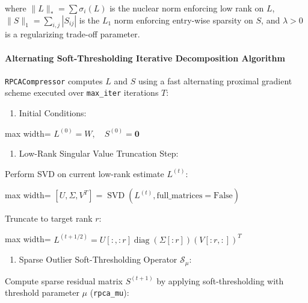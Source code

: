 where $\|L\|_* = \sum \sigma_i(L)$ is the nuclear norm enforcing low rank on $L$, $\|S\|_1 = \sum_{i,j} |S_{ij}|$ is the $L_1$ norm enforcing entry-wise sparsity on $S$, and $\lambda > 0$ is a regularizing trade-off parameter.

\paragraph{Alternating Soft-Thresholding Iterative Decomposition Algorithm}
\texttt{RPCACompressor} computes $L$ and $S$ using a fast alternating proximal gradient scheme executed over \texttt{max\_iter} iterations $T$:

\begin{enumerate}
\item Initial Conditions:
\end{enumerate}
\begin{center}
\begin{adjustbox}{max width=\columnwidth}
$\displaystyle
L^{(0)} = W, \quad S^{(0)} = \mathbf{0}
$
\end{adjustbox}
\end{center}

\begin{enumerate}
\item Low-Rank Singular Value Truncation Step:
\end{enumerate}
Perform SVD on current low-rank estimate $L^{(t)}$:

\begin{center}
\begin{adjustbox}{max width=\columnwidth}
$\displaystyle
[U, \Sigma, V^T] = \operatorname{SVD}\left(L^{(t)}, \text{full\_matrices}=\text{False}\right)
$
\end{adjustbox}
\end{center}

Truncate to target rank $r$:

\begin{center}
\begin{adjustbox}{max width=\columnwidth}
$\displaystyle
L^{(t+1/2)} = U[:, :r] \operatorname{diag}\left( \Sigma[:r] \right) (V[:r, :])^T
$
\end{adjustbox}
\end{center}

\begin{enumerate}
\item Sparse Outlier Soft-Thresholding Operator $\mathcal{S}_{\mu}$:
\end{enumerate}
Compute sparse residual matrix $S^{(t+1)}$ by applying soft-thresholding with threshold parameter $\mu$ (\texttt{rpca\_mu}):

